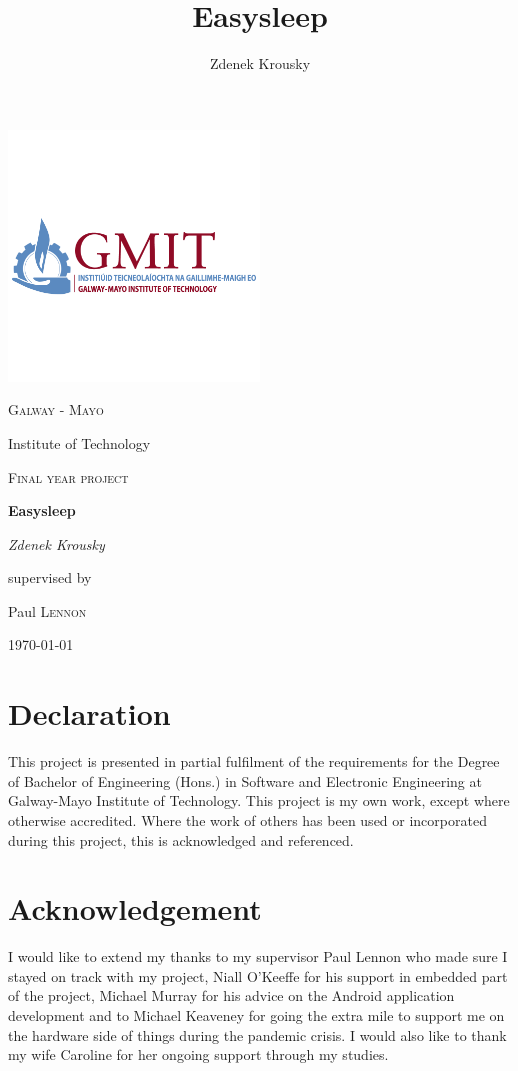 \documentclass[12pt,a4paper]{article}
\author{Zdenek Krousky}
\title{Easysleep}
\begin{document}
	\begin{titlepage}
		\centering
		\includegraphics[width=0.5\textwidth]{gmit_full1.png}\par\vspace{0cm}
		{\scshape\LARGE Galway - Mayo \par Institute of Technology \par}
		\vspace{1cm}
		{\scshape\Large Final year project\par}
		\vspace{1.5cm}
		{\Huge\bfseries Easysleep\par}
		\vspace{2cm}
		{\Large\itshape Zdenek Krousky\par}
		\vfill
		supervised by\par
		Paul \textsc{Lennon}
		
		\vfill
		
		{\large \today\par}
	\end{titlepage}
	
	\newpage
	\newpage
	
	\section*{Declaration}
	This project is presented in partial fulfilment of the requirements for the Degree of Bachelor of Engineering (Hons.) in Software and Electronic Engineering at Galway-Mayo Institute of Technology. This project is my own work, except where otherwise accredited. Where the work of others has been used or incorporated during this project, this is acknowledged and referenced.
	\newpage
	
	\section*{Acknowledgement}
	I would like to extend my thanks to my supervisor Paul Lennon who made sure I stayed on track with my project, Niall O'Keeffe for his support in embedded part of the project, Michael Murray for his advice on the Android application development and to Michael Keaveney for going the extra mile to support me on the hardware side of things during the pandemic crisis. I would also like to thank my wife Caroline for her ongoing support through my studies.
	\newpage
	\tableofcontents
	\newpage
	
\end{document}
